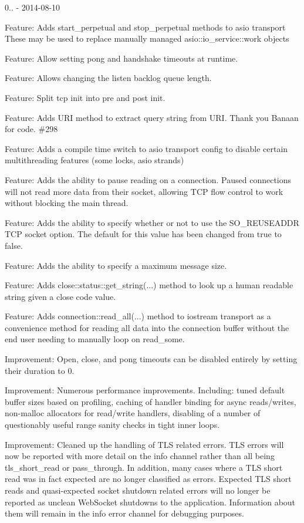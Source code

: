 0.. -\/ 2014-\/08-\/10
\begin{DoxyItemize}
\item Feature\+: Adds {\ttfamily start\+\_\+perpetual} and {\ttfamily stop\+\_\+perpetual} methods to asio transport These may be used to replace manually managed {\ttfamily asio\+::io\+\_\+service\+::work} objects
\item Feature\+: Allow setting pong and handshake timeouts at runtime.
\item Feature\+: Allows changing the listen backlog queue length.
\item Feature\+: Split tcp init into pre and post init.
\item Feature\+: Adds U\+RI method to extract query string from U\+RI. Thank you Banaan for code. \#298
\item Feature\+: Adds a compile time switch to asio transport config to disable certain multithreading features (some locks, asio strands)
\item Feature\+: Adds the ability to pause reading on a connection. Paused connections will not read more data from their socket, allowing T\+CP flow control to work without blocking the main thread.
\item Feature\+: Adds the ability to specify whether or not to use the {\ttfamily S\+O\+\_\+\+R\+E\+U\+S\+E\+A\+D\+DR} T\+CP socket option. The default for this value has been changed from {\ttfamily true} to {\ttfamily false}.
\item Feature\+: Adds the ability to specify a maximum message size.
\item Feature\+: Adds {\ttfamily close\+::status\+::get\+\_\+string(...)} method to look up a human readable string given a close code value.
\item Feature\+: Adds {\ttfamily connection\+::read\+\_\+all(...)} method to iostream transport as a convenience method for reading all data into the connection buffer without the end user needing to manually loop on {\ttfamily read\+\_\+some}.
\item Improvement\+: Open, close, and pong timeouts can be disabled entirely by setting their duration to 0.
\item Improvement\+: Numerous performance improvements. Including\+: tuned default buffer sizes based on profiling, caching of handler binding for async reads/writes, non-\/malloc allocators for read/write handlers, disabling of a number of questionably useful range sanity checks in tight inner loops.
\item Improvement\+: Cleaned up the handling of T\+LS related errors. T\+LS errors will now be reported with more detail on the info channel rather than all being {\ttfamily tls\+\_\+short\+\_\+read} or {\ttfamily pass\+\_\+through}. In addition, many cases where a T\+LS short read was in fact expected are no longer classified as errors. Expected T\+LS short reads and quasi-\/expected socket shutdown related errors will no longer be reported as unclean Web\+Socket shutdowns to the application. Information about them will remain in the info error channel for debugging purposes.

\end{DoxyItemize}
